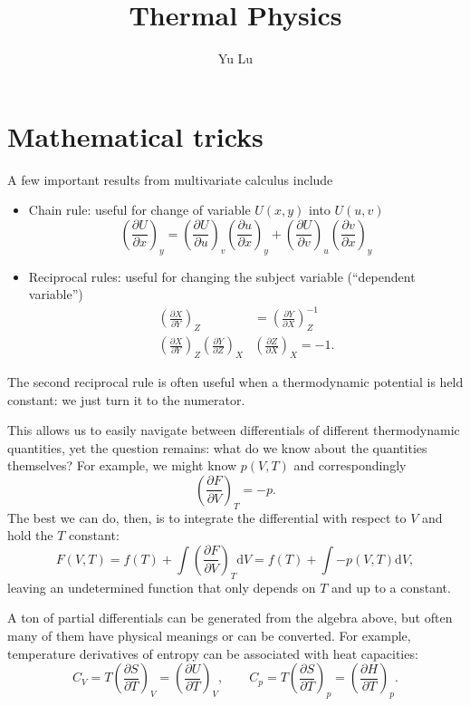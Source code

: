 \documentclass{article}
\title{Thermal Physics}
\author{Yu Lu}
\theoremstyle{nonumberplain}
\begin{document}
\maketitle
\section{Mathematical tricks}
A few important results from multivariate calculus include
\begin{itemize}
    \item Chain rule: useful for change of variable $U(x,y)$ into $U(u,v)$
    \[
        \left(\frac{\partial U}{\partial x} \right)_y = 
        \left(\frac{\partial U}{\partial u} \right)_v \left( \frac{\partial u}{\partial x} \right)_y
        + \left(\frac{\partial U}{\partial v} \right)_u \left( \frac{\partial v}{\partial x} \right)_y
    \]
    \item Reciprocal rules: useful for changing the subject variable (``dependent variable'')
    \[
        \begin{aligned}
            \left(\frac{\partial X}{\partial Y} \right)_Z &= \left(\frac{\partial Y}{\partial X} \right)_Z^{-1} \\
            \left(\frac{\partial X}{\partial Y} \right)_Z 
            \left(\frac{\partial Y}{\partial Z} \right)_X &
            \left(\frac{\partial Z}{\partial X} \right)_X = -1.
        \end{aligned}
    \]
\end{itemize}

The second reciprocal rule is often useful when a thermodynamic potential is held constant: we just turn it to the numerator. 

This allows us to easily navigate between differentials of different thermodynamic quantities, yet the question remains: what do we know about the quantities themselves? For example, we might know $p(V,T)$ and correspondingly
\[
    \left( \frac{\partial F}{\partial V} \right)_{T} = -p.
\]
The best we can do, then, is to integrate the differential with respect to $V$ and hold the $T$ constant:
\[
    F (V,T)
    = f(T) + \int \left( \frac{\partial F}{\partial V} \right)_{T} \mathrm{d} V
    = f(T) + \int -p(V,T) \mathrm{d} V, 
\]
leaving an undetermined function that only depends on $T$ and up to a constant. 

A ton of partial differentials can be generated from the algebra above, but often many of them have physical meanings or can be converted. For example, temperature derivatives of entropy can be associated with heat capacities:
\[
    \boxed{
    C_V = T \left(\frac{\partial S}{\partial T} \right)_V = \left(\frac{\partial U}{\partial T} \right)_V
    , \qquad 
    C_p = T \left(\frac{\partial S}{\partial T} \right)_p = \left(\frac{\partial H}{\partial T} \right)_p.}
\]
\end{document}
